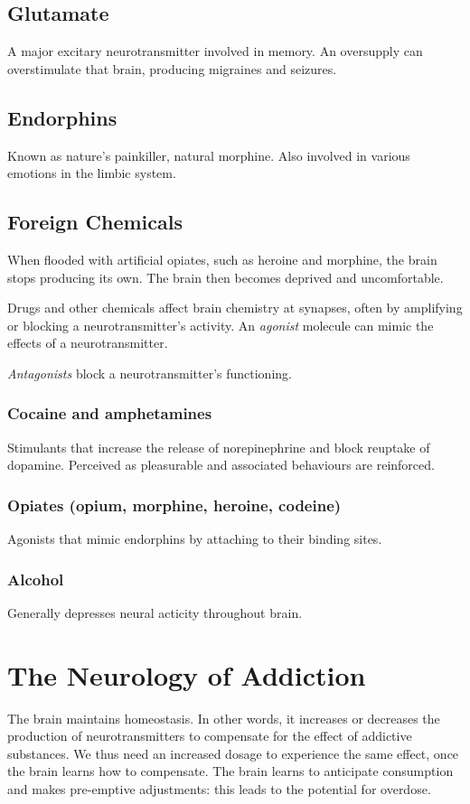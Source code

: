 \documentclass[12pt]{article}
\begin{document}
\subsection*{Glutamate}
A major excitary neurotransmitter involved in memory. An oversupply can overstimulate that brain, producing migraines and seizures.

\subsection*{Endorphins}
Known as nature's painkiller, natural morphine. Also involved in various emotions in the limbic system.

\subsection*{Foreign Chemicals}
When flooded with artificial opiates, such as heroine and morphine, the brain stops producing its own. The brain then becomes deprived and uncomfortable.

Drugs and other chemicals affect brain chemistry at synapses, often by amplifying or blocking a neurotransmitter's activity. An \textit{agonist} molecule can mimic the effects of a neurotransmitter.

\textit{Antagonists} block a neurotransmitter's functioning. 

\subsubsection*{Cocaine and amphetamines}
Stimulants that increase the release of norepinephrine and block reuptake of dopamine. Perceived as pleasurable and associated behaviours are reinforced. 

\subsubsection*{Opiates (opium, morphine, heroine, codeine)}
Agonists that mimic endorphins by attaching to their binding sites.

\subsubsection*{Alcohol}
Generally depresses neural acticity throughout brain. 

\section*{The Neurology of Addiction}
The brain maintains homeostasis. In other words, it increases or decreases the production of neurotransmitters to compensate for the effect of addictive substances. We thus need an increased dosage to experience the same effect, once the brain learns how to compensate. The brain learns to anticipate consumption and makes pre-emptive adjustments: this leads to the potential for overdose.
\end{document}
